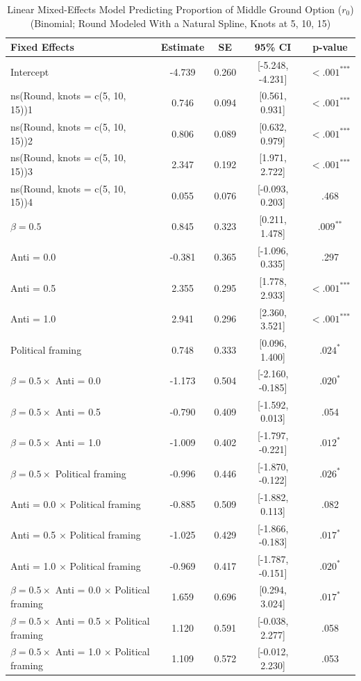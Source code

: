 \begin{table}[H]
\centering
\caption{Linear Mixed-Effects Model Predicting Proportion of Middle Ground Option ($r_0$) (Binomial; Round Modeled With a Natural Spline, Knots at 5, 10, 15)}
\label{tab:best_binom}
\begingroup
\footnotesize
\renewcommand{\arraystretch}{0.90} %

\begin{tabularx}{\linewidth}{Xcccc}
\toprule
\textbf{Fixed Effects} & \textbf{Estimate} & \textbf{SE} & \textbf{95\% CI} & \textbf{p-value} \\
\midrule
Intercept & -4.739 & 0.260 & [-5.248, -4.231] & $< .001^{\text{***}}$ \\
ns(Round, knots = c(5, 10, 15))1 & 0.746 & 0.094 & [0.561, 0.931] & $< .001^{\text{***}}$ \\
ns(Round, knots = c(5, 10, 15))2 & 0.806 & 0.089 & [0.632, 0.979] & $< .001^{\text{***}}$ \\
ns(Round, knots = c(5, 10, 15))3 & 2.347 & 0.192 & [1.971, 2.722] & $< .001^{\text{***}}$ \\
ns(Round, knots = c(5, 10, 15))4 & 0.055 & 0.076 & [-0.093, 0.203] & .468 \\
$\beta = 0.5$ & 0.845 & 0.323 & [0.211, 1.478] & $.009^{\text{**}}$ \\
Anti = 0.0 & -0.381 & 0.365 & [-1.096, 0.335] & .297 \\
Anti = 0.5 & 2.355 & 0.295 & [1.778, 2.933] & $< .001^{\text{***}}$ \\
Anti = 1.0 & 2.941 & 0.296 & [2.360, 3.521] & $< .001^{\text{***}}$ \\
Political framing & 0.748 & 0.333 & [0.096, 1.400] & $.024^{\text{*}}$ \\
$\beta = 0.5 \times$ Anti = 0.0 & -1.173 & 0.504 & [-2.160, -0.185] & $.020^{\text{*}}$ \\
$\beta = 0.5 \times$ Anti = 0.5 & -0.790 & 0.409 & [-1.592, 0.013] & .054 \\
$\beta = 0.5 \times$ Anti = 1.0 & -1.009 & 0.402 & [-1.797, -0.221] & $.012^{\text{*}}$ \\
$\beta = 0.5 \times$ Political framing & -0.996 & 0.446 & [-1.870, -0.122] & $.026^{\text{*}}$ \\
Anti = 0.0 $\times$ Political framing & -0.885 & 0.509 & [-1.882, 0.113] & .082 \\
Anti = 0.5 $\times$ Political framing & -1.025 & 0.429 & [-1.866, -0.183] & $.017^{\text{*}}$ \\
Anti = 1.0 $\times$ Political framing & -0.969 & 0.417 & [-1.787, -0.151] & $.020^{\text{*}}$ \\
$\beta = 0.5 \times$ Anti = 0.0 $\times$ Political framing & 1.659 & 0.696 & [0.294, 3.024] & $.017^{\text{*}}$ \\
$\beta = 0.5 \times$ Anti = 0.5 $\times$ Political framing & 1.120 & 0.591 & [-0.038, 2.277] & .058 \\
$\beta = 0.5 \times$ Anti = 1.0 $\times$ Political framing & 1.109 & 0.572 & [-0.012, 2.230] & .053 \\


\end{tabularx}
\end{table}
